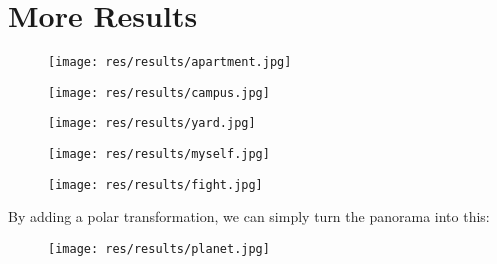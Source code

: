
\section{More Results}
\begin{figure}[H]
  \centering
  \texttt{[image: res/results/apartment.jpg]}
\end{figure}
\begin{figure}[H]
  \centering
  \texttt{[image: res/results/campus.jpg]}
\end{figure}

\begin{figure}[H]
  \centering
  \texttt{[image: res/results/yard.jpg]}
\end{figure}

\begin{figure}[H]
  \centering
  \texttt{[image: res/results/myself.jpg]}
\end{figure}

\begin{figure}[H]
  \centering
  \texttt{[image: res/results/fight.jpg]}
\end{figure}

\newpage
By adding a polar transformation, we can simply turn the panorama into this:

\begin{figure}[H]
  \centering
  \texttt{[image: res/results/planet.jpg]}
\end{figure}
